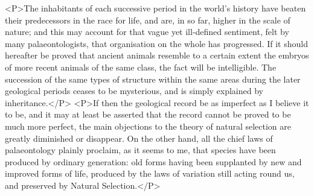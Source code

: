 <P>The inhabitants of each successive period in the world's history have beaten their predecessors in the race for life, and are, in so far, higher in the scale of nature; and this may account for that vague yet ill-defined sentiment, felt by many palaeontologists, that organisation on the whole has progressed. If it should hereafter be proved that ancient animals resemble to a certain extent the embryos of more recent animals of the same class, the fact will be intelligible. The succession of the same types of structure within the same areas during the later geological periods ceases to be mysterious, and is simply explained by inheritance.</P>
<P>If then the geological record be as imperfect as I believe it to be, and it may at least be asserted that the record cannot be proved to be much more perfect, the main objections to the theory of natural selection are greatly diminished or disappear. On the other hand, all the chief laws of palaeontology plainly proclaim, as it seems to me, that species have been produced by ordinary generation: old forms having been supplanted by new and improved forms of life, produced by the laws of variation still acting round us, and preserved by Natural Selection.</P>